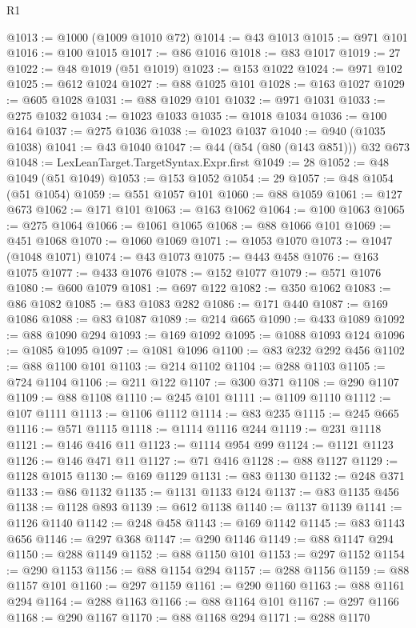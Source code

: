 \begin{lexlean}{R1}
\begin{coremodule}
@1013 := @1000 (@1009 @1010 @72)
@1014 := @43 @1013
@1015 := @971 @101
@1016 := @100 @1015
@1017 := @86 @1016
@1018 := @83 @1017
@1019 := 27
@1022 := @48 @1019 (@51 @1019)
@1023 := @153 @1022
@1024 := @971 @102
@1025 := @612 @1024
@1027 := @88 @1025 @101
@1028 := @163 @1027
@1029 := @605 @1028
@1031 := @88 @1029 @101
@1032 := @971 @1031
@1033 := @275 @1032
@1034 := @1023 @1033
@1035 := @1018 @1034
@1036 := @100 @164
@1037 := @275 @1036
@1038 := @1023 @1037
@1040 := @940 (@1035 @1038)
@1041 := @43 @1040
@1047 := @44 (@54 (@80 (@143 @851))) @32 @673
@1048 := LexLeanTarget.TargetSyntax.Expr.first
@1049 := 28
@1052 := @48 @1049 (@51 @1049)
@1053 := @153 @1052
@1054 := 29
@1057 := @48 @1054 (@51 @1054)
@1059 := @551 @1057 @101
@1060 := @88 @1059
@1061 := @127 @673
@1062 := @171 @101
@1063 := @163 @1062
@1064 := @100 @1063
@1065 := @275 @1064
@1066 := @1061 @1065
@1068 := @88 @1066 @101
@1069 := @451 @1068
@1070 := @1060 @1069
@1071 := @1053 @1070
@1073 := @1047 (@1048 @1071)
@1074 := @43 @1073
@1075 := @443 @458
@1076 := @163 @1075
@1077 := @433 @1076
@1078 := @152 @1077
@1079 := @571 @1076
@1080 := @600 @1079
@1081 := @697 @122
@1082 := @350 @1062
@1083 := @86 @1082
@1085 := @83 @1083 @282
@1086 := @171 @440
@1087 := @169 @1086
@1088 := @83 @1087
@1089 := @214 @665
@1090 := @433 @1089
@1092 := @88 @1090 @294
@1093 := @169 @1092
@1095 := @1088 @1093 @124
@1096 := @1085 @1095
@1097 := @1081 @1096
@1100 := @83 @232 @292 @456
@1102 := @88 @1100 @101
@1103 := @214 @1102
@1104 := @288 @1103
@1105 := @724 @1104
@1106 := @211 @122
@1107 := @300 @371
@1108 := @290 @1107
@1109 := @88 @1108
@1110 := @245 @101
@1111 := @1109 @1110
@1112 := @107 @1111
@1113 := @1106 @1112
@1114 := @83 @235
@1115 := @245 @665
@1116 := @571 @1115
@1118 := @1114 @1116 @244
@1119 := @231 @1118
@1121 := @146 @416 @11
@1123 := @1114 @954 @99
@1124 := @1121 @1123
@1126 := @146 @471 @11
@1127 := @71 @416
@1128 := @88 @1127
@1129 := @1128 @1015
@1130 := @169 @1129
@1131 := @83 @1130
@1132 := @248 @371
@1133 := @86 @1132
@1135 := @1131 @1133 @124
@1137 := @83 @1135 @456
@1138 := @1128 @893
@1139 := @612 @1138
@1140 := @1137 @1139
@1141 := @1126 @1140
@1142 := @248 @458
@1143 := @169 @1142
@1145 := @83 @1143 @656
@1146 := @297 @368
@1147 := @290 @1146
@1149 := @88 @1147 @294
@1150 := @288 @1149
@1152 := @88 @1150 @101
@1153 := @297 @1152
@1154 := @290 @1153
@1156 := @88 @1154 @294
@1157 := @288 @1156
@1159 := @88 @1157 @101
@1160 := @297 @1159
@1161 := @290 @1160
@1163 := @88 @1161 @294
@1164 := @288 @1163
@1166 := @88 @1164 @101
@1167 := @297 @1166
@1168 := @290 @1167
@1170 := @88 @1168 @294
@1171 := @288 @1170

\end{coremodule}
\end{lexlean}
